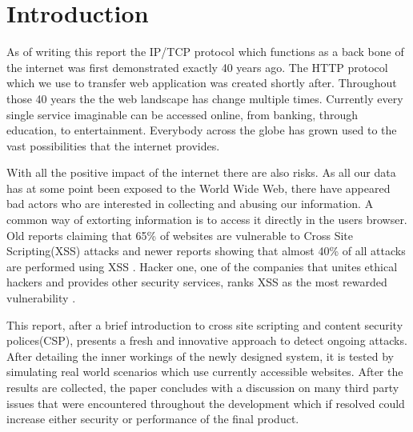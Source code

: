\chapter{Introduction}

As of writing this report the IP/TCP protocol which functions as a back bone of the internet was first demonstrated exactly 40 years ago.
The HTTP protocol which we use to transfer web application was created shortly after.
Throughout those 40 years the the web landscape has change multiple times.
Currently every single service imaginable can be accessed online, from banking, through education, to entertainment.
Everybody across the globe has grown used to the vast possibilities that the internet provides.

With all the positive impact of the internet there are also risks.
As all our data has at some point been exposed to the World Wide Web, there have appeared bad actors who are interested in collecting and abusing our information.
A common way of extorting information is to access it directly in the users browser.
Old reports claiming that 65\% of websites are vulnerable to Cross Site Scripting(XSS) attacks \cite{xssEverywhere} and newer reports showing that almost 40\% of all attacks are performed using XSS \cite{xssEverywhere2}.
Hacker one, one of the companies that unites ethical hackers and provides other security services, ranks XSS as the most rewarded vulnerability \cite{xssMoney}.

This report, after a brief introduction to cross site scripting and content security polices(CSP), presents a fresh and innovative approach to detect ongoing attacks.
After detailing the inner workings of the newly designed system, it is tested by simulating real world scenarios which use currently accessible websites.
After the results are collected, the paper concludes with a discussion on many third party issues that were encountered throughout the development which if resolved could increase either security or performance of the final product.



